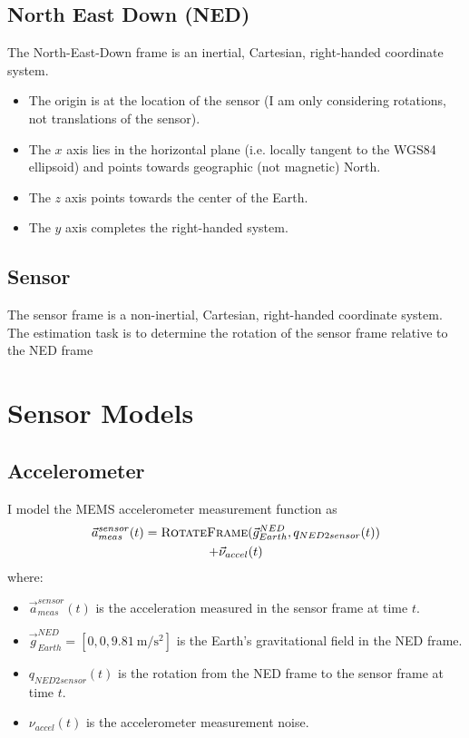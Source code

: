 \documentclass[conference]{IEEEtran}
\begin{document}
\subsection{North East Down (NED)}
The North-East-Down frame is an inertial, Cartesian, right-handed coordinate system.
\begin{itemize}
  \item The origin is at the location of the sensor (I am only considering rotations, not translations of the sensor).
  \item The $x$ axis lies in the horizontal plane (i.e. locally tangent to the WGS84 ellipsoid) and points towards geographic (not magnetic) North.
  \item The $z$ axis points towards the center of the Earth.
  \item The $y$ axis completes the right-handed system.
\end{itemize}

\subsection{Sensor}
The sensor frame is a non-inertial, Cartesian, right-handed coordinate system. The estimation task is to determine the rotation of the sensor frame relative to the NED frame

\section{Sensor Models}
\subsection{Accelerometer}
I model the MEMS accelerometer measurement function as
\begin{multline}
  \vec{a}_{meas}^{sensor}(t) = \textproc{RotateFrame}(\vec{g}_{Earth}^{NED}, q_{NED2sensor}(t)) \\
  + \vec{\nu}_{accel}(t)
\end{multline}
where:
\begin{itemize}
  \item $\vec{a}_{meas}^{sensor}(t)$ is the acceleration measured in the sensor frame at time $t$.
  \item $\vec{g}_{Earth}^{NED} = [0, 0, \SI{9.81}{\meter\per\second\squared}]$ is the Earth's gravitational field in the NED frame.
  \item $q_{NED2sensor}(t)$ is the rotation from the NED frame to the sensor frame at time $t$.
  \item $\nu_{accel}(t)$ is the accelerometer measurement noise.
\end{itemize}
\end{document}
